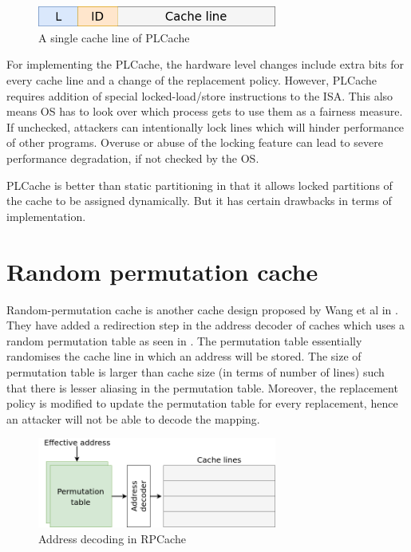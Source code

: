 \begin{figure}
    \centering
    \includegraphics[width=0.7\textwidth]{pl-cache}
    \caption{A single cache line of PLCache}
    \label{fig:plcache}
\end{figure}

For implementing the PLCache, the hardware level changes include extra bits for every cache line and a change of the
replacement policy. However, PLCache requires addition of special locked-load/store instructions to the ISA. This
also means OS has to look over which process gets to use them as a fairness measure. If unchecked, attackers can intentionally
lock lines which will hinder performance of other programs. Overuse or abuse of the locking feature can lead to severe
performance degradation, if not checked by the OS.

PLCache is better than static partitioning in that it allows locked partitions of the cache to be assigned dynamically.
But it has certain drawbacks in terms of implementation.

\section{Random permutation cache}

Random-permutation cache is another cache design proposed by Wang et al in .
They have added a redirection step in the address decoder of caches which uses a random permutation
table as seen in .
The permutation table essentially randomises the cache line in which an address will be stored.
The size of permutation table is larger than cache size (in terms of number of lines) such that there is
lesser aliasing in the permutation table. Moreover, the replacement policy is modified to update the permutation
table for every replacement, hence an attacker will not be able to decode the mapping.

\begin{figure}
    \centering
    \includegraphics[width=0.7\textwidth]{rp-cache}
    \caption{Address decoding in RPCache}
    \label{fig:rpcache}
\end{figure}

